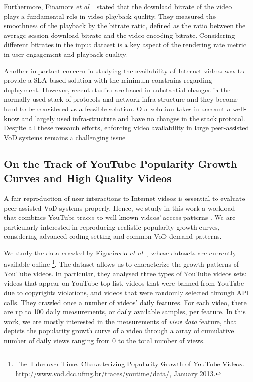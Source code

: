 Furthermore,  Finamore \emph{et al.}~\cite{Finamore_imc_2011} stated
that the download  bitrate of the video plays a fundamental role in video
playback quality.  They measured the smoothness of the playback by the
bitrate ratio,  defined as the ratio between the average session
download bitrate and  the video encoding bitrate. Considering
different bitrates in the input dataset is a key aspect of the rendering rate metric in user engagement 
and playback quality.

Another important concern in studying the availability of Internet videos was to provide a SLA-based solution with
the minimum constrains regarding deployment. However, recent studies\cite{d3_sigcomm2011,dctcp_sigcomm_2010} 
are based in substantial changes in the normally used stack of
protocols and network infra-structure and they become hard to be
considered as a feasible solution. Our solution takes in account a
well-know and largely used infra-structure and have no changes in the
stack protocol. Despite all these research efforts, enforcing video availability in large peer-assisted VoD systems remains a challenging issue.

\subsection{On the Track of YouTube Popularity Growth Curves and High Quality Videos}
\label{subsec:motivation_youtube_traces}

A fair reproduction of user interactions to Internet videos is essential to evaluate peer-assisted VoD systems properly. Hence, we study in this work a workload that combines YouTube traces\cite{youtube_wsdm_2011} to well-known videos{'} access patterns \cite{popularity_prediction_2010}. We are particularly interested in reproducing realistic popularity growth curves, considering advanced coding setting and common VoD demand patterns.

We study the data crawled by Figueiredo \emph{et al.} \cite{youtube_wsdm_2011}, whose datasets are currently available online \footnote{The Tube over Time: Characterizing Popularity Growth of YouTube Videos. http://www.vod.dcc.ufmg.br/traces/youtime/data/, January 2013.}. The dataset allows us to characterize the growth patterns of YouTube videos. In particular, they analysed three types of YouTube videos sets: videos that appear on YouTube top list, videos that were banned from YouTube due to copyrights violations, and videos that were randomly selected through API calls. They crawled once a number of videos' daily features. For each video, there are up to 100 daily measurements, or daily available samples, per feature. In this work, we are mostly interested in the measurements of \emph{view data} feature, that depicts the popularity growth curve of a video through a array of cumulative number of daily views ranging from 0 to the total number of views.


